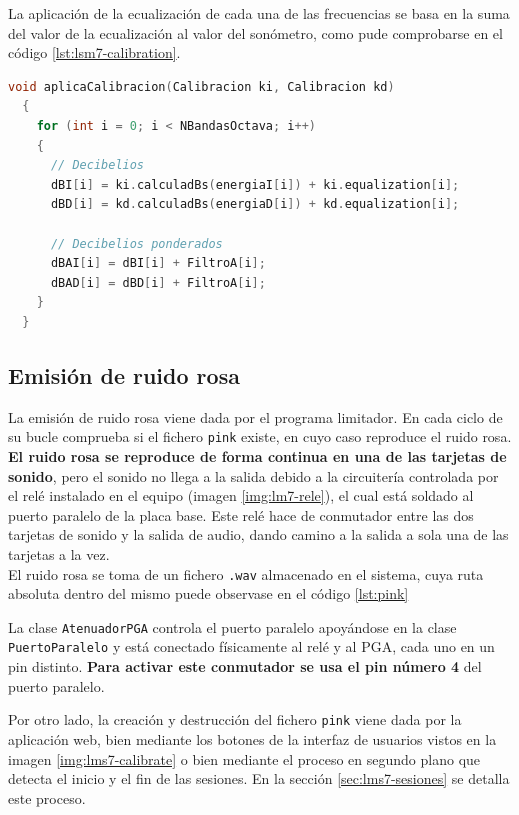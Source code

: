 La aplicación de la ecualización de cada una de las frecuencias se basa en la suma del valor de la ecualización al valor del sonómetro, como pude comprobarse en el código \ref{lst:lsm7-calibration}. \\
\newpage
\begin{lstlisting}[language=c++, label={lst:lsm7-calibration}, caption={Calculo de decibelios y aplicación de la ecualización.}]
  void aplicaCalibracion(Calibracion ki, Calibracion kd)
  {
    for (int i = 0; i < NBandasOctava; i++)
    {
      // Decibelios
      dBI[i] = ki.calculadBs(energiaI[i]) + ki.equalization[i];
      dBD[i] = kd.calculadBs(energiaD[i]) + kd.equalization[i];

	  // Decibelios ponderados
      dBAI[i] = dBI[i] + FiltroA[i];
      dBAD[i] = dBD[i] + FiltroA[i];
    }
  }
\end{lstlisting}

\subsection{Emisión de ruido rosa} \label{sec:lms7-pink}

La emisión de ruido rosa viene dada por el programa limitador. En cada ciclo de su bucle comprueba si el fichero \verb|pink| existe, en cuyo caso reproduce el ruido rosa. \textbf{El ruido rosa se reproduce de forma continua en una de las tarjetas de sonido}, pero el sonido no llega a la salida debido a la circuitería controlada por el relé instalado en el equipo (imagen \ref{img:lm7-rele}), el cual está soldado al puerto paralelo de la placa base. Este relé hace de conmutador entre las dos tarjetas de sonido y la salida de audio, dando camino a la salida a sola una de las tarjetas a la vez. \\
El ruido rosa se toma de un fichero \verb|.wav| almacenado en el sistema, cuya ruta absoluta dentro del mismo puede observase en el código \ref{lst:pink}

La clase \verb|AtenuadorPGA| controla el puerto paralelo apoyándose en la clase \verb|PuertoParalelo| y está conectado físicamente al relé y al \acrshort{PGA}, cada uno en un pin distinto. \textbf{Para activar este conmutador se usa el pin número 4} del puerto paralelo.

Por otro lado, la creación y destrucción del fichero \verb|pink| viene dada por la aplicación web, bien mediante los botones de la interfaz de usuarios vistos en la imagen \ref{img:lms7-calibrate} o bien mediante el proceso en segundo plano que detecta el inicio y el fin de las sesiones. En la sección \ref{sec:lms7-sesiones} se detalla este proceso. \\

